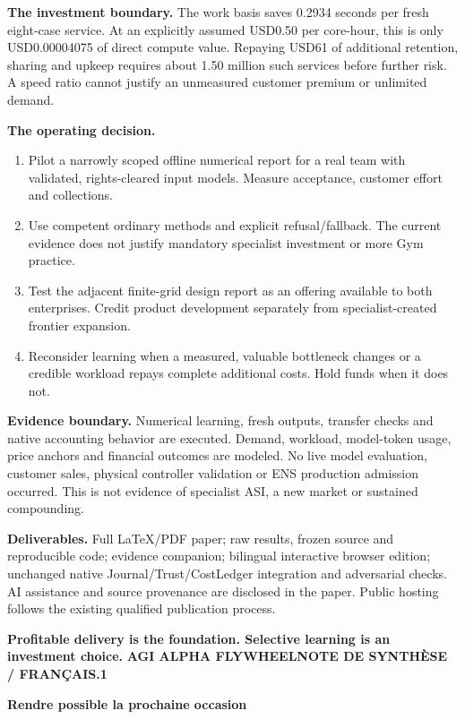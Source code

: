 \documentclass[10pt,letterpaper]{article}
\begin{document}
\textbf{The investment boundary.} The work basis saves 0.2934 seconds per fresh eight-case service. At an explicitly assumed USD0.50 per core-hour, this is only USD0.00004075 of direct compute value. Repaying USD61 of additional retention, sharing and upkeep requires about 1.50 million such services before further risk. A speed ratio cannot justify an unmeasured customer premium or unlimited demand.

\textbf{The operating decision.}
\begin{enumerate}
\item Pilot a narrowly scoped offline numerical report for a real team with validated, rights-cleared input models. Measure acceptance, customer effort and collections.
\item Use competent ordinary methods and explicit refusal/fallback. The current evidence does not justify mandatory specialist investment or more Gym practice.
\item Test the adjacent finite-grid design report as an offering available to both enterprises. Credit product development separately from specialist-created frontier expansion.
\item Reconsider learning when a measured, valuable bottleneck changes or a credible workload repays complete additional costs. Hold funds when it does not.
\end{enumerate}

\textbf{Evidence boundary.} Numerical learning, fresh outputs, transfer checks and native accounting behavior are executed. Demand, workload, model-token usage, price anchors and financial outcomes are modeled. No live model evaluation, customer sales, physical controller validation or ENS production admission occurred. This is not evidence of specialist ASI, a new market or sustained compounding.

\textbf{Deliverables.} Full LaTeX/PDF paper; raw results, frozen source and reproducible code; evidence companion; bilingual interactive browser edition; unchanged native Journal/Trust/CostLedger integration and adversarial checks. AI assistance and source provenance are disclosed in the paper. Public hosting follows the existing qualified publication process.

\vfill
{\small\bfseries\color{navy}Profitable delivery is the foundation. Selective learning is an investment choice.}
\newpage
{\small\bfseries\color{teal}AGI ALPHA FLYWHEEL\hfill NOTE DE SYNTHÈSE / FRANÇAIS.1}

{\LARGE\bfseries\color{navy}Rendre possible la prochaine occasion}
\end{document}
